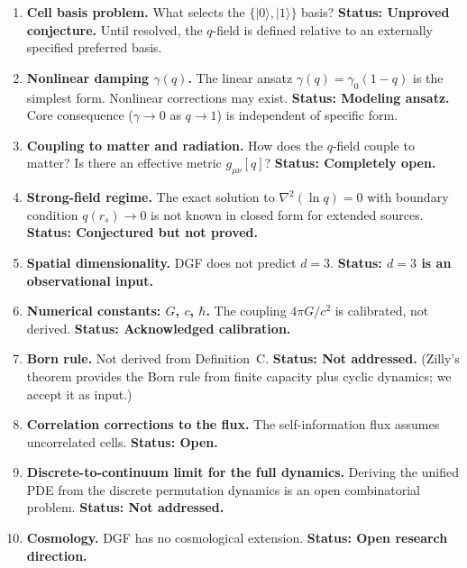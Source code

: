 \documentclass[reprint]{revtex4-2}
\begin{document}
\begin{enumerate}[leftmargin=*, label=\textbf{OP-\arabic*:}]

\item \textbf{Cell basis problem.} What selects the $\{|0\rangle,|1\rangle\}$ basis? \textbf{Status: Unproved conjecture.} Until resolved, the $q$-field is defined relative to an externally specified preferred basis.

\item \textbf{Nonlinear damping $\gamma(q)$.} The linear ansatz $\gamma(q)=\gamma_0(1-q)$ is the simplest form. Nonlinear corrections may exist. \textbf{Status: Modeling ansatz.} Core consequence ($\gamma\to 0$ as $q\to 1$) is independent of specific form.

\item \textbf{Coupling to matter and radiation.} How does the $q$-field couple to matter? Is there an effective metric $g_{\mu\nu}[q]$? \textbf{Status: Completely open.}

\item \textbf{Strong-field regime.} The exact solution to $\nabla^2(\ln q)=0$ with boundary condition $q(r_s)\to 0$ is not known in closed form for extended sources. \textbf{Status: Conjectured but not proved.}

\item \textbf{Spatial dimensionality.} DGF does not predict $d=3$. \textbf{Status: $d=3$ is an observational input.}

\item \textbf{Numerical constants: $G$, $c$, $\hbar$.} The coupling $4\pi G/c^2$ is calibrated, not derived. \textbf{Status: Acknowledged calibration.}

\item \textbf{Born rule.} Not derived from Definition~C. \textbf{Status: Not addressed.} (Zilly's theorem provides the Born rule from finite capacity plus cyclic dynamics; we accept it as input.)

\item \textbf{Correlation corrections to the flux.} The self-information flux assumes uncorrelated cells. \textbf{Status: Open.}

\item \textbf{Discrete-to-continuum limit for the full dynamics.} Deriving the unified PDE from the discrete permutation dynamics is an open combinatorial problem. \textbf{Status: Not addressed.}

\item \textbf{Cosmology.} DGF has no cosmological extension. \textbf{Status: Open research direction.}

\end{enumerate}
\end{document}
